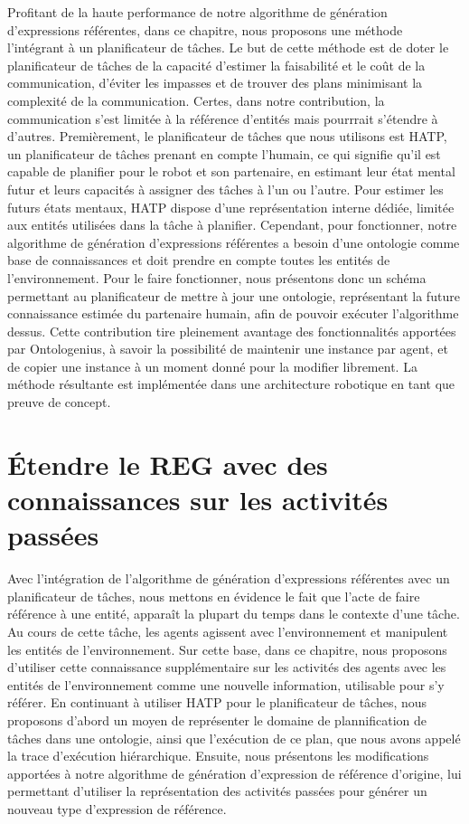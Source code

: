 Profitant de la haute performance de notre algorithme de génération d'expressions référentes, dans ce chapitre, nous proposons une méthode l'intégrant à un planificateur de tâches. Le but de cette méthode est de doter le planificateur de tâches de la capacité d'estimer la faisabilité et le coût de la communication, d'éviter les impasses et de trouver des plans minimisant la complexité de la communication. Certes, dans notre contribution, la communication s'est limitée à la référence d'entités mais pourrrait s'étendre à d'autres. Premièrement, le planificateur de tâches que nous utilisons est HATP, un planificateur de tâches prenant en compte l'humain, ce qui signifie qu'il est capable de planifier pour le robot et son partenaire, en estimant leur état mental futur et leurs capacités à assigner des tâches à l'un ou l'autre. Pour estimer les futurs états mentaux, HATP dispose d'une représentation interne dédiée, limitée aux entités utilisées dans la tâche à planifier. Cependant, pour fonctionner, notre algorithme de génération d'expressions référentes a besoin d'une ontologie comme base de connaissances et doit prendre en compte toutes les entités de l'environnement. Pour le faire fonctionner, nous présentons donc un schéma permettant au planificateur de mettre à jour une ontologie, représentant la future connaissance estimée du partenaire humain, afin de pouvoir exécuter l'algorithme dessus. Cette contribution tire pleinement avantage des fonctionnalités apportées par Ontologenius, à savoir la possibilité de maintenir une instance par agent, et de copier une instance à un moment donné pour la modifier librement. La méthode résultante est implémentée dans une architecture robotique en tant que preuve de concept. 

\section*{Étendre le REG avec des connaissances sur les activités passées}

Avec l'intégration de l'algorithme de génération d'expressions référentes avec un planificateur de tâches, nous mettons en évidence le fait que l'acte de faire référence à une entité, apparaît la plupart du temps dans le contexte d'une tâche. Au cours de cette tâche, les agents agissent avec l'environnement et manipulent les entités de l'environnement. Sur cette base, dans ce chapitre, nous proposons d'utiliser cette connaissance supplémentaire sur les activités des agents avec les entités de l'environnement comme une nouvelle information, utilisable pour s'y référer. En continuant à utiliser HATP pour le planificateur de tâches, nous proposons d'abord un moyen de représenter le domaine de plannification de tâches dans une ontologie, ainsi que l'exécution de ce plan, que nous avons appelé la trace d'exécution hiérarchique. Ensuite, nous présentons les modifications apportées à notre algorithme de génération d'expression de référence d'origine, lui permettant d'utiliser la représentation des activités passées pour générer un nouveau type d'expression de référence. 

